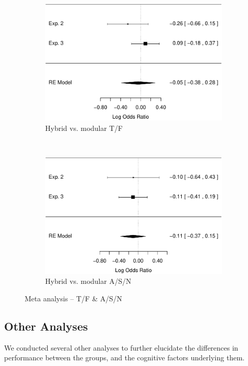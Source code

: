 \documentclass[man,10pt]{apa6}
\begin{document}
\begin{figure}
\begin{subfigure}[c]{0.4\textwidth}
\includegraphics[width=\textwidth]{figures/meta/question_typegenerator_TF_n_conditionhybrid.pdf}
\caption{Hybrid vs. modular T/F}
\end{subfigure}
~
\begin{subfigure}[c]{0.4\textwidth}
\centering
\includegraphics[width=\textwidth]{figures/meta/question_typegenerator_ASN_n_conditionhybrid.pdf}
\caption{Hybrid vs. modular A/S/N}
\end{subfigure}
\caption{Meta analysis -- T/F \& A/S/N}
\label{meta_genTF}
\end{figure}\noindent 
\FloatBarrier
\subsection{Other Analyses}
We conducted several other analyses to further elucidate the differences in performance between the groups, and the cognitive factors underlying them.\\
\end{document}
